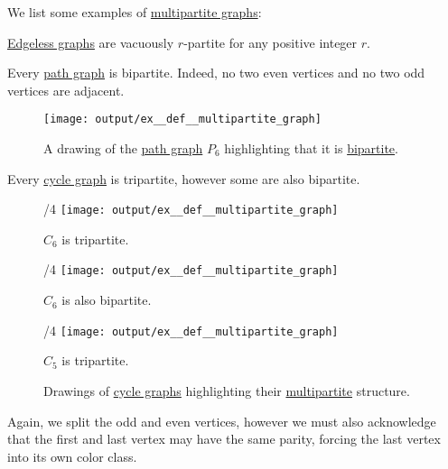 \begin{example}\label{ex:def:multipartite_graph}
  We list some examples of \hyperref[def:multipartite_graph]{multipartite graphs}:
  \begin{thmenum}
     \hyperref[def:edgeless_graph]{Edgeless graphs} are vacuously \( r \)-partite for any positive integer \( r \).

     Every \hyperref[def:path_graph]{path graph} is bipartite. Indeed, no two even vertices and no two odd vertices are adjacent.
    \begin{figure}[!ht]
      \centering
      \texttt{[image: output/ex\_\_def\_\_multipartite\_graph]}
      \caption{A drawing of the \hyperref[def:path_graph]{path graph} \( P_6 \) highlighting that it is \hyperref[def:multipartite_graph]{bipartite}.}\label{fig:ex:def:multipartite_graph/path}
    \end{figure}

     Every \hyperref[def:cycle_graph]{cycle graph} is tripartite, however some are also bipartite.

    \begin{figure}[!ht]
      \begin{subcaptionblock}{\textwidth/4}
        \centering
        \texttt{[image: output/ex\_\_def\_\_multipartite\_graph]}
        \caption{\( C_6 \) is tripartite.}\label{fig:ex:def:multipartite_graph/cycle/c6_tripartite}
      \end{subcaptionblock}
      \hfill
      \begin{subcaptionblock}{\textwidth/4}
        \centering
        \texttt{[image: output/ex\_\_def\_\_multipartite\_graph]}
        \caption{\( C_6 \) is also bipartite.}\label{fig:ex:def:multipartite_graph/cycle/c6_bipartite}
      \end{subcaptionblock}
      \hfill
      \begin{subcaptionblock}{\textwidth/4}
        \centering
        \texttt{[image: output/ex\_\_def\_\_multipartite\_graph]}
        \caption{\( C_5 \) is tripartite.}\label{fig:ex:def:multipartite_graph/cycle/c5}
      \end{subcaptionblock}
      \caption{Drawings of \hyperref[def:cycle_graph]{cycle graphs} highlighting their \hyperref[def:multipartite_graph]{multipartite} structure.}\label{fig:ex:def:multipartite_graph/cycle}
    \end{figure}

    Again, we split the odd and even vertices, however we must also acknowledge that the first and last vertex may have the same parity, forcing the last vertex into its own color class.
  \end{thmenum}
\end{example}

